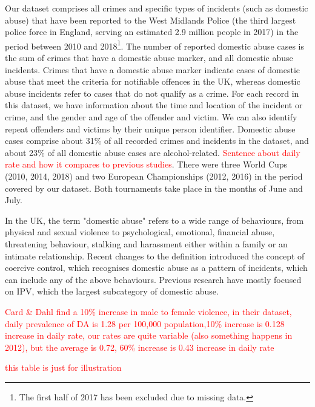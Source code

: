 \documentclass[12pt, letterpaper]{article}
\begin{document}
Our dataset comprises all crimes and specific types of incidents (such as domestic abuse) that have been reported to the West Midlands Police (the third largest police force in England\autocite{Homeoffice}, serving an estimated 2.9 million people in 2017\autocite{populationfigure}) in the period between 2010 and 2018\footnote{The first half of 2017 has been excluded due to missing data.}. The number of reported domestic abuse cases is the sum of crimes that have a domestic abuse marker, and all domestic abuse incidents. Crimes that have a domestic abuse marker indicate cases of domestic abuse that meet the criteria for notifiable offences in the UK, whereas domestic abuse incidents refer to cases that do not qualify as a crime. For each record in this dataset, we have information about the time and location of the incident or crime, and the gender and age of the offender and victim. We can also identify repeat offenders and victims by their unique person identifier. Domestic abuse cases comprise about 31\% of all recorded crimes and incidents in the dataset, and about 23\% of all domestic abuse cases are alcohol-related. \textcolor{red}{Sentence about daily rate and how it compares to previous studies}. There were three World Cups (2010, 2014, 2018) and two European Championships (2012, 2016) in the period covered by our dataset. Both tournaments take place in the months of June and July.

In the UK, the term "domestic abuse" refers to a wide range of behaviours, from physical and sexual violence to psychological, emotional, financial abuse, threatening behaviour, stalking and harassment either within a family or an intimate relationship\autocite{ONS}. Recent changes to the definition introduced the concept of coercive control, which recognises domestic abuse as a pattern of incidents, which can include any of the above behaviours. Previous research have mostly focused on IPV, which the largest subcategory of domestic abuse. 




\textcolor{red}{Card \& Dahl find a 10\% increase in male to female violence, in their dataset, daily prevalence of DA is 1.28 per 100,000 population,10\% increase is 0.128 increase in daily rate, our rates are quite variable (also something happens in 2012), but the average is 0.72, 60\% increase is 0.43 increase in daily rate}
 
\textcolor{red}{this table is just for illustration}
\end{document}
